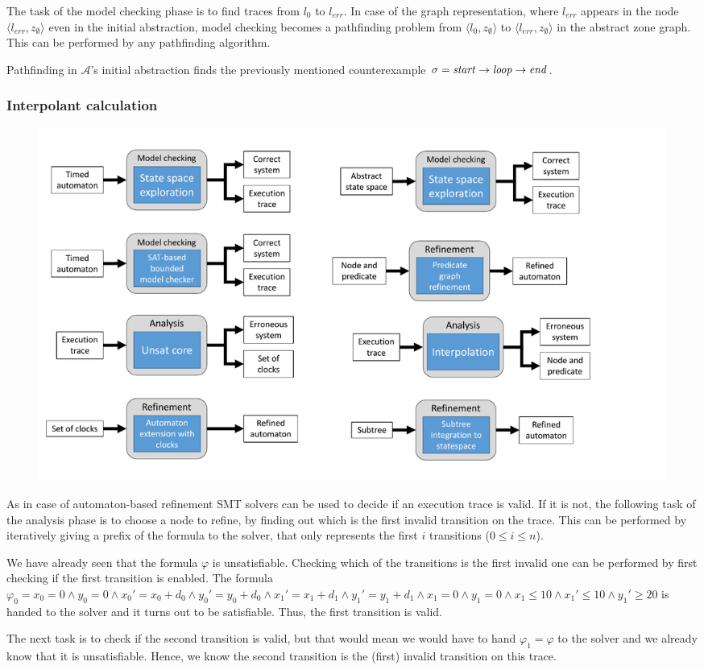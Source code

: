The task of the model checking phase is to find traces from $l_0$ to $l_{err}$. In case of the graph representation, where $l_{err}$ appears in the node  $\langle l_{err}, z_{\emptyset} \rangle$ even in the initial abstraction, model checking becomes a pathfinding problem from $\langle l_{0}, z_{\emptyset} \rangle$ to $\langle l_{err}, z_{\emptyset} \rangle$ in the abstract zone graph. This can be performed by any pathfinding algorithm.

\begin{runningExample}
	Pathfinding in $\mathcal{A}$'s initial abstraction finds the previously mentioned counterexample $\sigma= \text{\emph{start}} \to \text{\emph{loop}} \to \text{\emph{end}}$.
\end{runningExample}

\subsubsection{Interpolant calculation}

\begin{figure}[h]
	\centering
	\includegraphics[width=.7\textwidth]{include/figures/pred_modules_anal}
\end{figure}

As in case of automaton-based refinement SMT solvers can be used to decide if an execution trace is valid. If it is not, the following task of the analysis phase is to choose a node to refine, by finding out which is the first invalid transition on the trace. This can be performed by iteratively giving a prefix of the formula to the solver, that only represents the first $i$ transitions ($0 \leq i \leq n$).

\begin{runningExample}
	We have already seen that the formula $\varphi$ is unsatisfiable. Checking which of the transitions is the first invalid one can be performed by first checking if the first transition is enabled. The formula $\varphi_0=x_0=0 \wedge y_0=0 \wedge x_0'=x_0+d_0 \wedge y_0'=y_0+d_0 \wedge x_1'=x_1+d_1 \wedge y_1'=y_1+d_1 \wedge x_1=0 \wedge y_1=0 \wedge x_1 \leq 10 \wedge x_1' \leq 10 \wedge y_1' \geq 20$ is handed to the solver and it turns out to be satisfiable. Thus, the first transition is valid.
	
	The next task is to check if the second transition is valid, but that would mean we would have to hand $\varphi_1=\varphi$ to the solver and we already know that it is unsatisfiable. Hence, we know the second transition is the (first) invalid transition on this trace.
\end{runningExample}

